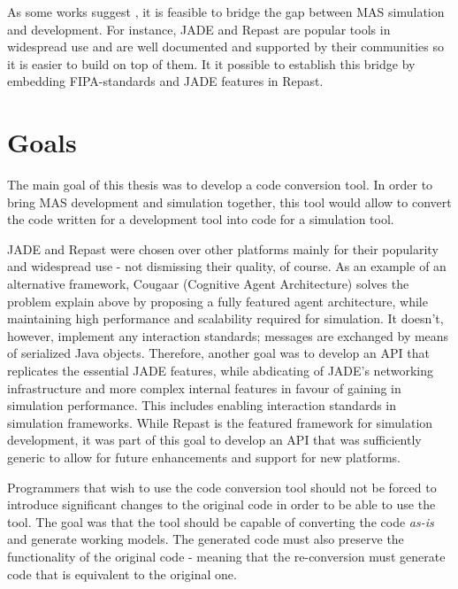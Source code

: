 As some works suggest \cite{gormer2011jrep,garcia2011misia,warden2010towards}, it is feasible to bridge the gap between MAS simulation and development. For instance, JADE and Repast are popular tools in widespread use and are well documented and supported by their communities so it is easier to build on top of them. It it possible to establish this bridge by embedding FIPA-standards and JADE features in Repast.

\section{Goals}
The main goal of this thesis was to develop a code conversion tool. In order to bring MAS development and simulation together, this tool would allow to convert the code written for a development tool into code for a simulation tool. 

JADE and Repast were chosen over other platforms mainly for their popularity and widespread use - not dismissing their quality, of course. As an example of an alternative framework, Cougaar (Cognitive Agent Architecture)\cite{helsinger2004cougaar} solves the problem explain above by proposing a fully featured agent architecture, while maintaining high performance and scalability required for simulation. It doesn't, however, implement any interaction standards; messages are exchanged by means of serialized Java objects. Therefore, another goal was to develop an API that replicates the essential JADE features, while abdicating of JADE's networking infrastructure and more complex internal features in favour of gaining in simulation performance. This includes enabling interaction standards in simulation frameworks. While Repast is the featured framework for simulation development, it was part of this goal to develop an API that was sufficiently generic to allow for future enhancements and support for new platforms.

Programmers that wish to use the code conversion tool should not be forced to introduce significant changes to the original code in order to be able to use the tool. The goal was that the tool should be capable of converting the code \emph{as-is} and generate working models. The generated code must also preserve the functionality of the original code - meaning that the re-conversion must generate code that is equivalent to the original one.

